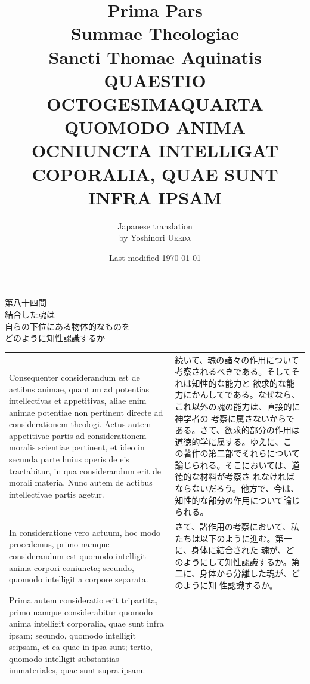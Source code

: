 \documentclass[paper=a4paper,fontsize=10pt,jafontsize=9pt,titlepage]{jlreq}
\title{{\bfseries Prima Pars}\\{\Huge Summae Theologiae}\\Sancti Thomae
Aquinatis\\{\sffamily QUAESTIO OCTOGESIMAQUARTA}\\{\bfseries QUOMODO ANIMA OCNIUNCTA INTELLIGAT COPORALIA, QUAE SUNT INFRA IPSAM}}
\author{Japanese translation\\by Yoshinori {\scshape Ueeda}}
\date{Last modified \today}
\begin{document}
\maketitle

\begin{center}
 {\Large 第八十四問\\結合した魂は\\自らの下位にある物体的なものを\\どのように知性認識するか}
\end{center}

\begin{longtable}{p{21em}p{21em}}
Consequenter considerandum est de actibus animae, quantum ad potentias
intellectivas et appetitivas, aliae enim animae potentiae non pertinent directe
ad considerationem theologi. Actus autem appetitivae partis ad considerationem
moralis scientiae pertinent, et ideo in secunda parte huius operis de eis
tractabitur, in qua considerandum erit de morali materia. Nunc autem de actibus
 intellectivae partis agetur.

 &

 続いて、魂の諸々の作用について考察されるべきである。そしてそれは知性的な能力と
 欲求的な能力にかんしてである。なぜなら、これ以外の魂の能力は、直接的に神学者の
 考察に属さないからである。さて、欲求的部分の作用は道徳的学に属する。ゆえに、こ
 の著作の第二部でそれらについて論じられる。そこにおいては、道徳的な材料が考察さ
 れなければならないだろう。他方で、今は、知性的な部分の作用について論じられる。

 \\[1em]

 In consideratione vero actuum, hoc modo procedemus,
primo namque considerandum est quomodo intelligit anima corpori coniuncta;
 secundo, quomodo intelligit a corpore separata.

 &

 さて、諸作用の考察において、私たちは以下のように進む。第一に、身体に結合された
 魂が、どのようにして知性認識するか。第二に、身体から分離した魂が、どのように知
 性認識するか。

 \\[1em]

 Prima autem consideratio erit tripartita, primo namque considerabitur quomodo
anima intelligit corporalia, quae sunt infra ipsam; secundo, quomodo intelligit
seipsam, et ea quae in ipsa sunt; tertio, quomodo intelligit substantias
 immateriales, quae sunt supra ipsam.

 &


\end{longtable}
\end{document}
